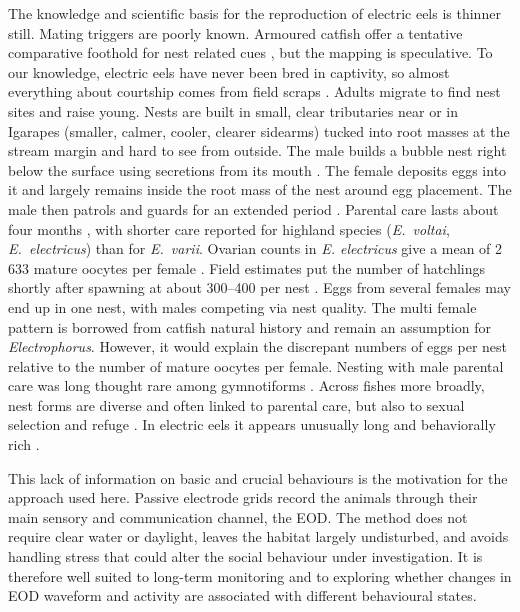 The knowledge and scientific basis for the reproduction of electric eels is thinner still.
Mating triggers are poorly known. 
Armoured catfish offer a tentative comparative foothold for nest related cues \parencite{hostache1998reproductive}, but the mapping is speculative. 
To our knowledge, electric eels have never been bred in captivity, so almost everything about courtship comes from field scraps \parencite{senarat2025ventral, assunccao1995reproduction}.
Adults migrate to find nest sites and raise young.
Nests are built in small, clear tributaries near or in Igarapes (smaller, calmer, cooler, clearer sidearms) tucked into root masses at the stream margin and hard to see from outside. 
The male builds a bubble nest right below the surface using secretions from its mouth \parencite{assunccao1995reproduction,bastos2020historia}. 
The female deposits eggs into it and largely remains inside the root mass of the nest around egg placement. 
The male then patrols and guards for an extended period \parencite{assunccao1995reproduction, bastos2020historia}. 
Parental care lasts about four months \parencite{bastos2020historia}, with shorter care reported for highland species (\textit{E.\ voltai}, \textit{E.\ electricus}) than for \textit{E.\ varii}. 
Ovarian counts in \textit{E. electricus} give a mean of 2\,633 mature oocytes per female \parencite{saoliveira2012fecundidade}. 
Field estimates put the number of hatchlings shortly after spawning at about 300--400 per nest \parencite{bastos2020historia}.
Eggs from several females may end up in one nest, with males competing via nest quality. 
The multi female pattern is borrowed from catfish natural history \parencite{hostache1998reproductive} and remain an assumption for \textit{Electrophorus}. 
However, it would explain the discrepant numbers of eggs per nest relative to the number of mature oocytes per female.
Nesting with male parental care was long thought rare among gymnotiforms \parencite{crampton2005nesting}. 
Across fishes more broadly, nest forms are diverse and often linked to parental care, but also to sexual selection and refuge \parencite{bessa2022integrative}.
In electric eels it appears unusually long and behaviorally rich \parencite{bastos2020historia}. 

This lack of information on basic and crucial behaviours is the motivation for the approach used here. 
Passive electrode grids record the animals through their main sensory and communication channel, the EOD. 
The method does not require clear water or daylight, leaves the habitat largely undisturbed, and avoids handling stress that could alter the social behaviour under investigation. 
It is therefore well suited to long-term monitoring and to exploring whether changes in EOD waveform and activity are associated with different behavioural states.

